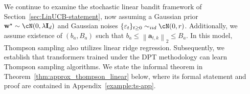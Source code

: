 \documentclass[10pt]{article}
\newtheorem{theorem}{Theorem}
\newcommand{\id}{\bI}
\newcommand{\eps}{\varepsilon}
\newcommand{\norm}[1]{\left\|{#1}\right\|} %
\newcommand{\ltwo}[1]{\norm{#1}_2} %
\newcommand{\<}{\left\langle}
\renewcommand{\>}{\right\rangle}
\newcommand{\lth}{{(\ell)}}
\newcommand{\TF}{{\rm TF}}
\newcommand{\nrmp}[1]{{\left|\!\left|\!\left|{#1}\right|\!\right|\!\right|}}
\newcommand{\TS}{{\mathrm{TS}}}
\newcommand{\Tpspar}{{\lambda}}  %
\newcommand{\Tpsparn}{{r}} %
\newcommand{\trunprob}{{\eta_1}}
\newcommand{\Trunregpa}{{\eta_2}}  %
\newcommand{\Trunregp}{{\eta}}
\newcommand{\tcO}{{\tilde{\mathcal O}}}
\newcommand{\state}{{s}}
\newcommand{\action}{{a}}
\newcommand{\totlen}{{T}} %
\newcommand{\cat}{{\tt cat}}
\newcommand{\extractmap}{{\tt A}}
\newcommand{\embedmap}{{\tt h}}
\newcommand{\sAlg}{{\mathsf{Alg}}}
\newcommand{\dset}{{D}}
\newcommand{\tfpar}{{\btheta}}
\newcommand{\hidden}{{D'}}
\newcommand{\clipval}{{\mathsf{R}}}
\newcommand{\neuron}{{\mathsf{M_0}}}
\newcommand{\weightn}{{{\mathsf{C_0}}}}
\def\bI{{\mathbf I}}
\def\btheta{{\boldsymbol \theta}}
\def\ba{{\mathbf a}}
\def\bw{{\mathbf w}}
\newcommand{\authnote}[2]{{\scriptsize $\ll$\textsf{#1 notes: #2}$\gg$}}
\newcommand{\authnote}[2]{}
\newcommand{\lc}[1]{{\color{blue}\authnote{Licong}{#1}}}
\begin{document}
We continue to examine the stochastic linear bandit framework of Section~\ref{sec:LinUCB-statement}, now assuming a Gaussian prior $\bw^\star\sim \cN(0,\Tpspar\id_d)$ and Gaussian noises $\{ \eps_t \}_{t \ge 0} \sim_{iid} \cN(0,\Tpsparn)$. Additionally, we assume existence of $(b_a, B_a)$ such that $b_a\leq\ltwo{\ba_{t,k}}\leq B_a$. In this model, Thompson sampling also utilizes linear ridge regression. Subsequently, we establish that transformers trained under the DPT methodology can learn Thompson sampling algorithms. We state the informal theorem in Theorem~\ref{thm:approx_thompson_linear} below, where its formal statement and proof are contained in Appendix~\ref{example:ts-app}. 

\end{document}
